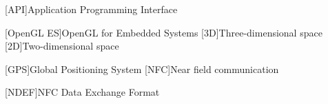 [API]{Application Programming Interface}

[OpenGL ES]{OpenGL for Embedded Systems}
[3D]{Three-dimensional space}
[2D]{Two-dimensional space}

[GPS]{Global Positioning System}
[NFC]{Near field communication}

[NDEF]{NFC Data Exchange Format}

